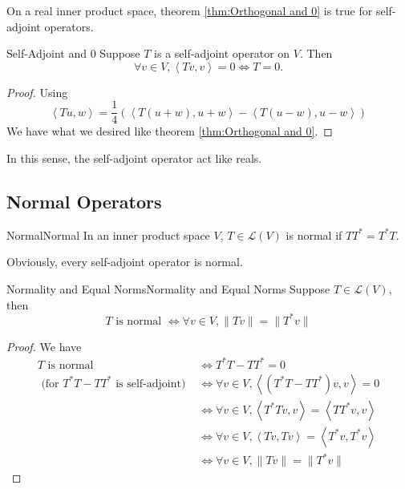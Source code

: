 \documentclass[../main.tex]{subfiles}
\begin{document}
On a real inner product space, theorem \ref{thm:Orthogonal and 0} is true for self-adjoint operators.

\begin{theorem}{}{Self-Adjoint and 0}
Suppose $T$ is a self-adjoint operator on $V$. Then
\begin{equation*}
\forall v\in V,\left<Tv,v\right> =0 \Longleftrightarrow T=0.
\end{equation*}
\end{theorem}
\begin{proof}
Using
\begin{equation*}
\left<Tu,w\right> = \frac{1}{4} \left(\left<T(u+w),u+w\right> - \left<T(u-w),u-w\right> \right)
\end{equation*}
We have what we desired like theorem \ref{thm:Orthogonal and 0}.
\end{proof}

\begin{remark}
In this sense, the self-adjoint operator act like reals.
\end{remark}


\subsection{Normal Operators}
\begin{definition}{Normal}{Normal}
In an inner product space $V$, $T\in \mathscr{L}(V)$ is normal if $T T^* = T^*T$.
\end{definition}
Obviously, every self-adjoint operator is normal.

\begin{theorem}{Normality and Equal Norms}{Normality and Equal Norms}
Suppose $T\in \mathscr{L}(V)$, then
\begin{equation*}
T \text{ is normal }\Longleftrightarrow \forall v\in V, \|Tv\|=\|T^*v\|
\end{equation*}
\end{theorem}
\begin{proof}
We have
\begin{equation*}
\begin{aligned}
	T \text{ is normal } & \Longleftrightarrow T^* T-TT^*=0\\
	\text{ (for $T^*T-T T^*$ is self-adjoint) }	     & \Longleftrightarrow \forall v\in V, \left<(T^*T-T T^*)v,v\right> =0\\
		     & \Longleftrightarrow \forall v\in V, \left<T^*Tv,v\right> = \left<T T^*v,v\right> \\
		     & \Longleftrightarrow \forall v\in V, \left<Tv,Tv\right> = \left<T^*v,T^*v\right> \\
		     & \Longleftrightarrow \forall v\in V, \|Tv\|=\|T^*v\|
\end{aligned}
\end{equation*}
\end{proof}
\end{document}
